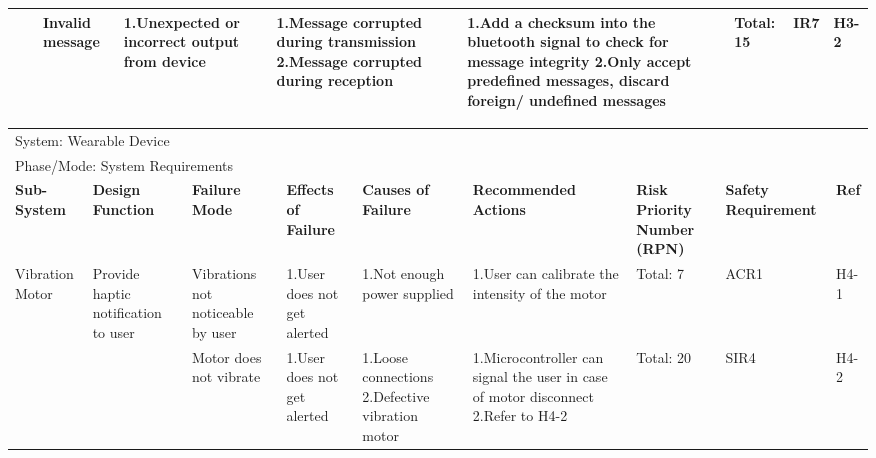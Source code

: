 \documentclass[12pt, titlepage]{article}
\begin{document}
\begin{landscape}
\begin{table}[H]
\begin{tabular}{| p{} | p{}  | p{} | p{} | p{} | p{} | p{} | p{} | p{} |}
         & & Invalid message & 1.Unexpected or incorrect output from device & 1.Message corrupted during transmission \newline 2.Message corrupted during reception & 1.Add a checksum into the bluetooth signal to check for message integrity \newline 2.Only accept predefined messages, discard foreign/ undefined messages & Total: 15 & IR7 & H3-2 \\ \hline
    
        \end{tabular}
        \hspace*{-1cm}
\end{table}

\begin{table}[H]
    \centering
        
        \begin{tabular}{| p{} | p{}  | p{} | p{} | p{} | p{} | p{} | p{} | p{} |}
        \hline
        
        \multicolumn{9}{|l|}{System: Wearable Device} \\
        \multicolumn{9}{|l|}{Phase/Mode: System Requirements} \\ \hline
        \textbf{Sub-System} & \textbf{Design Function} & \textbf{Failure Mode} & \textbf{Effects of Failure} & \textbf{Causes of Failure} & \textbf{Recommended Actions} & \textbf{Risk Priority Number (RPN)} & \textbf{Safety Requirement} & \textbf{Ref} \\ \hline

         Vibration Motor & Provide haptic notification to user & Vibrations not noticeable by user & 1.User does not get alerted & 1.Not enough power supplied & 1.User can calibrate the intensity of the motor & Total: 7 & ACR1 & H4-1 \\ \cline{3-9}
    
         & & Motor does not vibrate & 1.User does not get alerted & 1.Loose connections \newline 2.Defective vibration motor  & 1.Microcontroller can signal the user in case of motor disconnect \newline 2.Refer to  H4-2  & Total: 20 & SIR4 & H4-2 \\ \cline{3-9}
     

\end{tabular}
\end{table}
\end{landscape}
\end{document}
